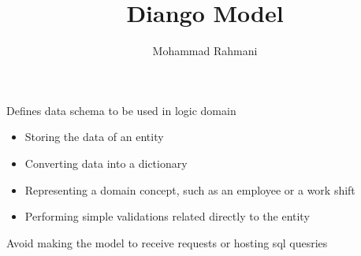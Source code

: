 \documentclass[a4paper]{article}
\title{Diango Model}
\date{}
\author{Mohammad Rahmani}
\begin{document}
    \maketitle
    Defines data schema to be used in logic domain
    \begin{itemize}
        \item Storing the data of an entity
        \item Converting data into a dictionary
        \item Representing a domain concept, such as an employee or a work shift
        \item Performing simple validations related directly to the entity
    \end{itemize}
    Avoid making the model to receive requests or hosting sql quesries

%    
%    
\end{document}
